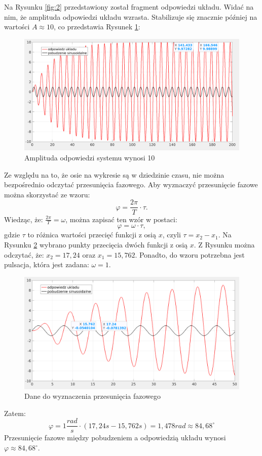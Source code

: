 \documentclass[12pt]{article}
\begin{document}
Na Rysunku \ref{fig:2} przedstawiony został fragment odpowiedzi układu. Widać na nim, że amplituda odpowiedzi układu wzrasta. Stabilizuje się znacznie później na wartości $A \approx 10$, co przedstawia Rysunek \ref{fig:2.22}:
\begin{figure}[H]
    \centering
    \includegraphics[scale=0.2]{2.22.png}
    \caption{Amplituda odpowiedzi systemu wynosi 10}
    \label{fig:2.22}
\end{figure}

Ze względu na to, że osie na wykresie są w dziedzinie czasu, nie można bezpośrednio odczytać przesunięcia fazowego. Aby wyznaczyć przesunięcie fazowe można skorzystać ze wzoru:
\begin{equation}
    \varphi = \frac{2 \pi}{T} \cdot \tau.
\end{equation}
Wiedząc, że: $\frac{2 \pi}{T} = \omega$, można zapisać ten wzór w postaci:
\begin{equation}
    \varphi = \omega \cdot \tau,
\end{equation}
gdzie $\tau$ to różnica wartości przecięć funkcji z osią $x$, czyli $\tau = x_2 - x_1$. Na Rysunku \ref{fig:2.23} wybrano punkty przecięcia dwóch funkcji z osią $x$. Z Rysunku można odczytać, że: $x_2 = 17,24$ oraz $x_1 = 15,762$. Ponadto, do wzoru potrzebna jest pulsacja, która jest zadana: $\omega = 1$. 
\begin{figure}[H]
    \centering
    \includegraphics[scale=0.2]{2.23.png}
    \caption{Dane do wyznaczenia przesunięcia fazowego}
    \label{fig:2.23}
\end{figure}
Zatem:
\begin{equation}
    \varphi = 1 \frac{rad}{s} \cdot (17,24 s-15,762s) = 1,478 rad \approx 84,68 ^\circ
\end{equation}
Przesunięcie fazowe między pobudzeniem a odpowiedzią układu wynosi $\varphi \approx 84,68 ^\circ$.
\end{document}
